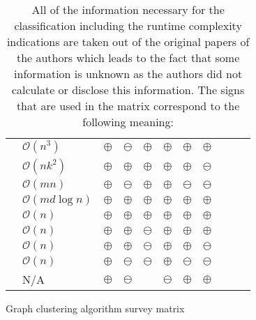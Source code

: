 \documentclass[12pt,a4paper]{report}
\begin{document}
\begin{table}[ht!]
\def\arraystretch{1.60}
\begin{tabularx}{\textwidth}{|Y||p{2.5cm}|Y|Y|Y|Y|Y|Y|Y|Y|Y|}
 \hline
  &  &  &  &  &  &  &  \\
 \hline\hline
 \cite{girvan2002community}     & \(\mathcal{O}(n^3)\)          & $\oplus$  & $\ominus$  & $\oplus$   & $\oplus$  & $\oplus$  & $\oplus$ \\\hline
 \cite{vandongen2000graph}      & \(\mathcal{O}(nk^2)\)         & $\oplus$  & $\oplus$   & $\oplus$   & $\oplus$  & $\oplus$  & $\ominus$ \\\hline
 \cite{pons2005computing}       & \(\mathcal{O}(mn)\)           & $\oplus$  & $\ominus$  & $\oplus$   & $\oplus$  & $\ominus$ & $\ominus$ \\\hline
 \cite{clauset2004modularity}   & \(\mathcal{O}(md \log{n})\)   & $\oplus$  & $\oplus$   & $\oplus$   & $\oplus$  & $\oplus$  & $\oplus$ \\\hline
 \cite{blondel2008modularity}   & \(\mathcal{O}(n)\)            & $\oplus$  & $\oplus$   & $\oplus$   & $\oplus$  & $\oplus$  & $\oplus$ \\\hline
 \cite{rosvall2008infomap}      & \(\mathcal{O}(n)\)            & $\oplus$  & $\oplus$   & $\ominus$  & $\oplus$  & $\oplus$  & $\oplus$ \\\hline
 \cite{biemann2006chinese}      & \(\mathcal{O}(n)\)            & $\oplus$  & $\oplus$   & $\ominus$  & $\oplus$  & $\oplus$  & $\ominus$ \\\hline
 \cite{reichardt2004detecting}  & \(\mathcal{O}(n)\)            & $\oplus$  & $\ominus$  & $\ominus$  & $\oplus$  & $\ominus$ & $\ominus$ \\\hline
 \cite{donetti2004detecting}    & N/A                           & $\oplus$  & $\ominus$  & ~          & $\ominus$  & $\oplus$  & $\oplus$ \\\hline
\end{tabularx}
\caption{Graph clustering algorithm survey matrix}
\caption*{
  All of the information necessary for the classification including the
  runtime complexity indications are taken out of the original papers of the
  authors which leads to the fact that some information is unknown as
  the authors did not calculate or disclose this information.
  The signs that are used in the matrix correspond to the following meaning:
}
\end{table}
\end{document}
